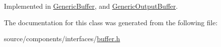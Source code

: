 Implemented in \hyperlink{classGenericBuffer_c5a0781106485f9567898b49021f6346}{GenericBuffer}, and \hyperlink{classGenericOutputBuffer_f2b4047e054df5bb9b624ce0b0bbf0e2}{GenericOutputBuffer}.

The documentation for this class was generated from the following file:\begin{CompactItemize}
\item 
source/components/interfaces/\hyperlink{buffer_8h}{buffer.h}\end{CompactItemize}
